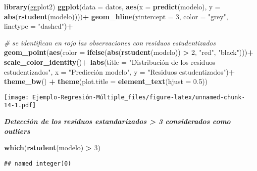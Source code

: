 \documentclass[]{article}
\newenvironment{Shaded}{\begin{snugshade}}{\end{snugshade}}
\newcommand{\KeywordTok}[1]{\textcolor[rgb]{0.13,0.29,0.53}{\textbf{#1}}}
\newcommand{\DataTypeTok}[1]{\textcolor[rgb]{0.13,0.29,0.53}{#1}}
\newcommand{\DecValTok}[1]{\textcolor[rgb]{0.00,0.00,0.81}{#1}}
\newcommand{\FloatTok}[1]{\textcolor[rgb]{0.00,0.00,0.81}{#1}}
\newcommand{\StringTok}[1]{\textcolor[rgb]{0.31,0.60,0.02}{#1}}
\newcommand{\CommentTok}[1]{\textcolor[rgb]{0.56,0.35,0.01}{\textit{#1}}}
\newcommand{\OperatorTok}[1]{\textcolor[rgb]{0.81,0.36,0.00}{\textbf{#1}}}
\newcommand{\NormalTok}[1]{#1}
\begin{document}
\begin{Shaded}
\begin{Highlighting}[]
\KeywordTok{library}\NormalTok{(ggplot2)}
\KeywordTok{ggplot}\NormalTok{(}\DataTypeTok{data =}\NormalTok{ datos, }\KeywordTok{aes}\NormalTok{(}\DataTypeTok{x =} \KeywordTok{predict}\NormalTok{(modelo), }
                        \DataTypeTok{y =} \KeywordTok{abs}\NormalTok{(}\KeywordTok{rstudent}\NormalTok{(modelo))))}\OperatorTok{+}
\StringTok{  }\KeywordTok{geom_hline}\NormalTok{(}\DataTypeTok{yintercept =} \DecValTok{3}\NormalTok{, }\DataTypeTok{color =} \StringTok{"grey"}\NormalTok{, }\DataTypeTok{linetype =} \StringTok{"dashed"}\NormalTok{)}\OperatorTok{+}

\CommentTok{# se identifican en rojo las observaciones con residuos estudentizados}
\KeywordTok{geom_point}\NormalTok{(}\KeywordTok{aes}\NormalTok{(}\DataTypeTok{color =} \KeywordTok{ifelse}\NormalTok{(}\KeywordTok{abs}\NormalTok{(}\KeywordTok{rstudent}\NormalTok{(modelo)) }\OperatorTok{>}\StringTok{ }\DecValTok{2}\NormalTok{, }\StringTok{"red"}\NormalTok{, }\StringTok{"black"}\NormalTok{)))}\OperatorTok{+}
\StringTok{  }\KeywordTok{scale_color_identity}\NormalTok{()}\OperatorTok{+}
\StringTok{  }\KeywordTok{labs}\NormalTok{(}\DataTypeTok{title =} \StringTok{"Distribución de los residuos estudentizados"}\NormalTok{, }
       \DataTypeTok{x =} \StringTok{"Predicción modelo"}\NormalTok{, }
       \DataTypeTok{y =} \StringTok{"Residuos estudentizados"}\NormalTok{)}\OperatorTok{+}
\StringTok{  }\KeywordTok{theme_bw}\NormalTok{() }\OperatorTok{+}\StringTok{ }\KeywordTok{theme}\NormalTok{(}\DataTypeTok{plot.title =} \KeywordTok{element_text}\NormalTok{(}\DataTypeTok{hjust =} \FloatTok{0.5}\NormalTok{))}
\end{Highlighting}
\end{Shaded}

\texttt{[image: Ejemplo-Regresión-Múltiple\_files/figure-latex/unnamed-chunk-14-1.pdf]}

\emph{\textbf{Detección de los residuos estandarizados \textgreater{} 3
considerados como outliers}}

\begin{Shaded}
\begin{Highlighting}[]
\KeywordTok{which}\NormalTok{(}\KeywordTok{rstudent}\NormalTok{(modelo) }\OperatorTok{>}\StringTok{ }\DecValTok{3}\NormalTok{)}
\end{Highlighting}
\end{Shaded}

\begin{verbatim}
## named integer(0)
\end{verbatim}
\end{document}
